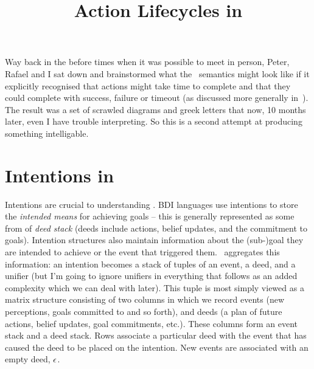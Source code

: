 \documentclass{blue-book}
\title{Action Lifecycles in \gwendolen}
\begin{document}
\maketitle

Way back in the before times when it was possible to meet in person, Peter, Rafael and I sat down and brainstormed what the \gwendolen\ semantics might look like if it explicitly recognised that actions might take time to complete and that they could complete with success, failure or timeout (as discussed more generally in~\cite{dennis14,dennis14:_action_durat_failur_bdi_languag}).  The result was a set of scrawled diagrams and greek letters that now, 10 months later, even I have trouble interpreting.  So this is a second attempt at producing something intelligable.

\section{Intentions in \gwendolen}
\label{sec:intentions}

Intentions are crucial to understanding \gwendolen.  BDI languages use intentions to
store the \emph{intended means} for achieving goals -- this is
generally represented as some from of {\em deed stack} (deeds include
actions, belief updates, and the commitment to
goals).  Intention structures 
also maintain information about the (sub-)goal they are intended to
achieve or the event that triggered them. \gwendolen\ aggregates
this information: an intention becomes a stack of tuples of an
event, a deed, and a
unifier (but I'm going to ignore unifiers in everything that follows as an added complexity which we can deal with later).  This tuple is most
simply viewed as a matrix structure consisting of two columns in
which we record events (new perceptions, goals committed to and so
forth),  and deeds (a plan of future actions, belief updates, goal
commitments, etc.). These columns form an event stack and a deed
stack.  Rows associate a
particular deed with the event that has caused the deed to be placed
on the intention. New events are associated with an empty
deed, $\epsilon$.
\end{document}
